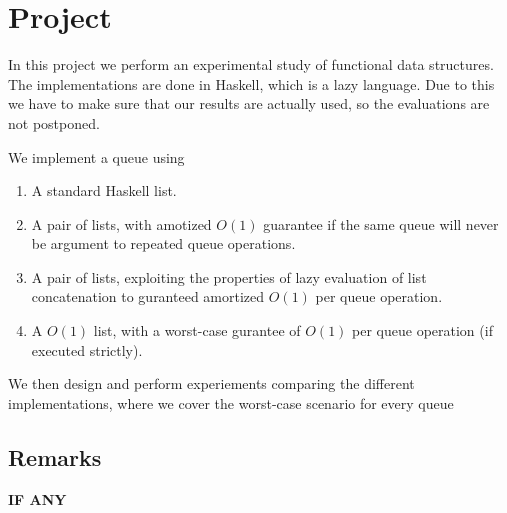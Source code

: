 \section*{Project}
In this project we perform an experimental study of functional data structures. The implementations are done in Haskell, which is a lazy language. Due to this we have to make sure that our results are actually used, so the evaluations are not postponed.

We implement a queue using
\begin{enumerate}
 \item A standard Haskell list.
 \item A pair of lists, with amotized $O(1)$ guarantee if the same queue will never be argument to repeated queue operations.
 \item A pair of lists, exploiting the properties of lazy evaluation of list concatenation to guranteed amortized $O(1)$ per queue operation.
 \item A $O(1)$ list, with a worst-case gurantee of $O(1)$ per queue operation (if executed strictly).
\end{enumerate}

We then design and perform experiements comparing the different implementations, where we cover the worst-case scenario for every queue

\subsection*{Remarks}
\textbf{IF ANY}